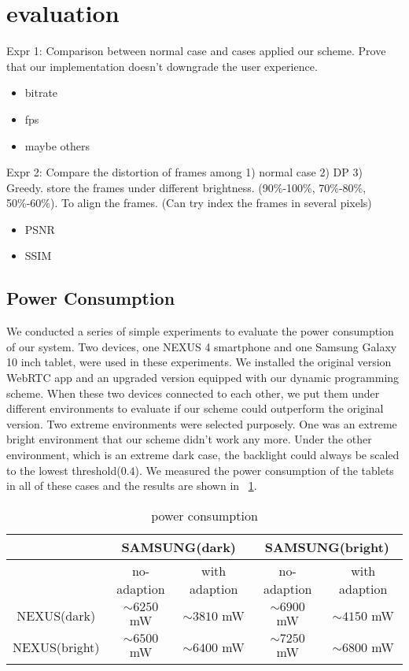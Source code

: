 \section{evaluation}
\label{sec:evaluation}

Expr 1:
Comparison between normal case and cases applied our scheme.
Prove that our implementation doesn't downgrade the user experience.
\begin{itemize}
  \item{bitrate}
  \item{fps}
  \item{maybe others}
\end{itemize}

Expr 2:
Compare the distortion of frames among 1) normal case 2) DP 3)
Greedy. store the frames under different brightness. (90\%-100\%,
70\%-80\%, 50\%-60\%).
To align the frames. (Can try index the frames in several pixels)
\begin{itemize}
  \item{PSNR}
  \item{SSIM}
\end{itemize}


\subsection{Power Consumption}
We conducted a series of simple experiments to evaluate the power
consumption of our system. Two devices, one NEXUS 4 smartphone and one
Samsung Galaxy 10 inch tablet, were used in these experiments. We
installed the original version WebRTC app and an upgraded version
equipped with our dynamic programming scheme. When these two devices
connected to each other, we put them under different environments to
evaluate if our scheme could outperform the original version. Two
extreme environments were selected purposely. One was an extreme
bright environment that our scheme didn't work any more. Under the
other environment, which is an extreme dark case, the backlight could
always be scaled to the lowest threshold($0.4$). We measured the power
consumption of the tablets in all of these cases and the results are
shown in ~\ref{tab:power_consumption}.


\begin{table}[h]
  \centering
  \caption{power consumption}
  \label{tab:power_consumption}
  \begin{tabular}{|c|c|c|c|c|} %
    \hline
    & \multicolumn{2}{|c|}{SAMSUNG(dark)} & \multicolumn{2}{|c|}{SAMSUNG(bright)} \\ \hline
    & no-adaption & with adaption & no-adaption & with adaption \\ \hline
    NEXUS(dark) & $\sim{6250}$ mW & $\sim{3810}$ mW & $\sim{6900}$ mW & $\sim{4150}$ mW  \\ \hline
    NEXUS(bright) & $\sim{6500}$ mW & $\sim{6400}$ mW & $\sim{7250}$ mW & $\sim{6800}$ mW \\ \hline
  \end{tabular}
  
\end{table}

